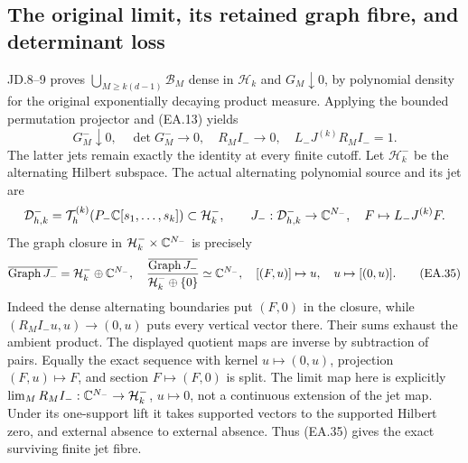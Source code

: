 \subsection{The original limit, its retained graph fibre, and determinant loss}

JD.8--9 proves \(\bigcup_{M\ge k(d-1)}\mathcal B_M\) dense in \(\mathcal H_k\)
and \(G_M\downarrow0\), by polynomial density for the original
exponentially decaying product measure.  Applying the bounded
permutation projector and (EA.13) yields
\[
 G_M^-\downarrow0,\quad \det G_M^-\to0,\quad
 R_MI_-\to0,\quad L_-J^{(k)}R_MI_-=1.
 \tag{EA.34}
\]
The latter jets remain exactly the identity at every finite cutoff.
Let \(\mathcal H_k^-\) be the alternating Hilbert subspace.  The
actual alternating polynomial source and its jet are
\[
 \mathcal D_{h,k}^-=\mathcal T_h^{(k)}
                (P_-\mathbb C[s_1,\ldots,s_k])\subset\mathcal H_k^-,
 \qquad J_-:\mathcal D_{h,k}^-\to\mathbb C^{N_-},\quad
 F\mapsto L_-J^{(k)}F.
\]
The graph closure in \(\mathcal H_k^-\times\mathbb C^{N_-}\) is precisely
\[
 \overline{\operatorname{Graph}J_-}=\mathcal H_k^-\oplus\mathbb C^{N_-},
 \quad
 \frac{\overline{\operatorname{Graph}J_-}}
                  {\mathcal H_k^-\oplus\{0\}}\simeq\mathbb C^{N_-},
 \quad [(F,u)]\mapsto u,\quad u\mapsto[(0,u)].
 \tag{EA.35}
\]
Indeed the dense alternating boundaries put \((F,0)\) in the
closure, while \((R_MI_-u,u)\to(0,u)\) puts every vertical
vector there.  Their sums exhaust the ambient product.  The displayed
quotient maps are inverse by subtraction of pairs.  Equally the exact
sequence with kernel \(u\mapsto(0,u)\), projection
\((F,u)\mapsto F\), and section \(F\mapsto(F,0)\) is split.
The limit map here is explicitly
\(\lim_M R_MI_-:\mathbb C^{N_-}\to\mathcal H_k^-\), \(u\mapsto0\),
not a continuous extension of the jet map.  Under its one-support lift it takes supported vectors
to the supported Hilbert zero, and external absence to external
absence.  Thus (EA.35) gives the exact surviving finite jet fibre.

